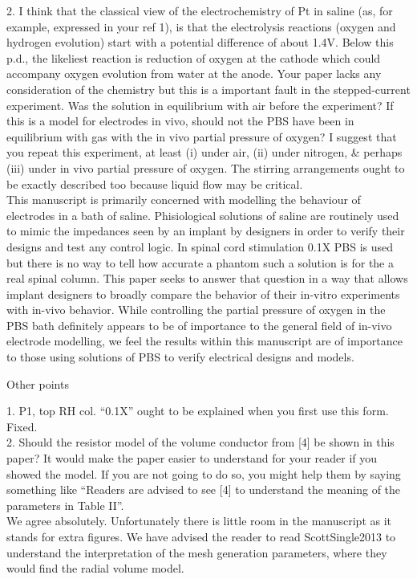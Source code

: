 \documentclass[journal, a4paper]{IEEEtran}
\begin{document}
{2. I think that the classical view of the electrochemistry of Pt in saline (as, for example, expressed in your ref 1), is that the electrolysis reactions (oxygen and hydrogen evolution) start with a potential difference of about 1.4V. Below this p.d., the likeliest reaction is reduction of oxygen at the cathode which could accompany oxygen evolution from water at the anode. Your paper lacks any consideration of the chemistry but this is a important fault in the stepped-current experiment. Was the solution in equilibrium with air before the experiment? If this is a model for electrodes in vivo, should not the PBS have been in equilibrium with gas with the in vivo partial pressure of oxygen? I suggest that you repeat this experiment, at least (i) under air, (ii) under nitrogen, \& perhaps (iii) under in vivo partial pressure of oxygen. The stirring arrangements ought to be exactly described too because liquid flow may be critical.\\
{\color{OliveGreen}This manuscript is primarily concerned with modelling the behaviour of electrodes in a bath of saline. Phisiological solutions of saline are routinely used to mimic the impedances seen by an implant by designers in order to verify their designs and test any control logic. In spinal cord stimulation 0.1X PBS is used but there is no way to tell how accurate a phantom such a solution is for the a real spinal column. This paper seeks to answer that question in a way that allows implant designers to broadly compare the behavior of their in-vitro experiments with in-vivo behavior. While controlling the partial pressure of oxygen in the PBS bath definitely appears to be of importance to the general field of in-vivo electrode modelling, we feel the results within this manuscript are of importance to those using solutions of PBS to verify electrical designs and models.}

Other points


1. P1, top RH col. ``0.1X'' ought to be explained when you first use this form.\\
{\color{OliveGreen}Fixed.}\\


2. Should the resistor model of the volume conductor from [4] be shown in this paper? It would make the paper easier to understand for your reader if you showed the model. If you are not going to do so, you might help them by saying something like ``Readers are advised to see [4] to understand the meaning of the parameters in Table II''.\\
{\color{OliveGreen}We agree absolutely. Unfortunately there is little room in the manuscript as it stands for extra figures. We have advised the reader to read ScottSingle2013 to understand the interpretation of the mesh generation parameters, where they would find the radial volume model.}\\


}
\end{document}

